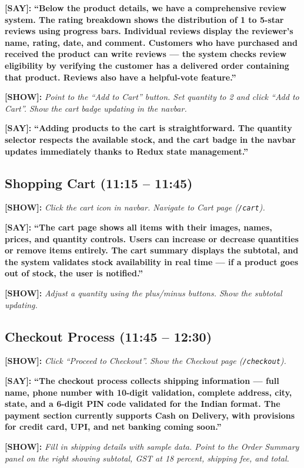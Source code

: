 \documentclass[12pt,a4paper]{article}
\newcommand{\say}[1]{\textbf{\textcolor{narration}{[SAY]:}} \textbf{``#1''}}
\newcommand{\show}[1]{\textbf{\textcolor{screen}{[SHOW]:}} \textit{#1}}
\begin{document}
\say{Below the product details, we have a comprehensive review system. The rating breakdown shows the distribution of 1 to 5-star reviews using progress bars. Individual reviews display the reviewer's name, rating, date, and comment. Customers who have purchased and received the product can write reviews --- the system checks review eligibility by verifying the customer has a delivered order containing that product. Reviews also have a helpful-vote feature.}

\show{Point to the ``Add to Cart'' button. Set quantity to 2 and click ``Add to Cart''. Show the cart badge updating in the navbar.}

\say{Adding products to the cart is straightforward. The quantity selector respects the available stock, and the cart badge in the navbar updates immediately thanks to Redux state management.}

\subsection{Shopping Cart (11:15 -- 11:45)}

\show{Click the cart icon in navbar. Navigate to Cart page (\texttt{/cart}).}

\say{The cart page shows all items with their images, names, prices, and quantity controls. Users can increase or decrease quantities or remove items entirely. The cart summary displays the subtotal, and the system validates stock availability in real time --- if a product goes out of stock, the user is notified.}

\show{Adjust a quantity using the plus/minus buttons. Show the subtotal updating.}

\subsection{Checkout Process (11:45 -- 12:30)}

\show{Click ``Proceed to Checkout''. Show the Checkout page (\texttt{/checkout}).}

\say{The checkout process collects shipping information --- full name, phone number with 10-digit validation, complete address, city, state, and a 6-digit PIN code validated for the Indian format. The payment section currently supports Cash on Delivery, with provisions for credit card, UPI, and net banking coming soon.}

\show{Fill in shipping details with sample data. Point to the Order Summary panel on the right showing subtotal, GST at 18 percent, shipping fee, and total.}
\end{document}
